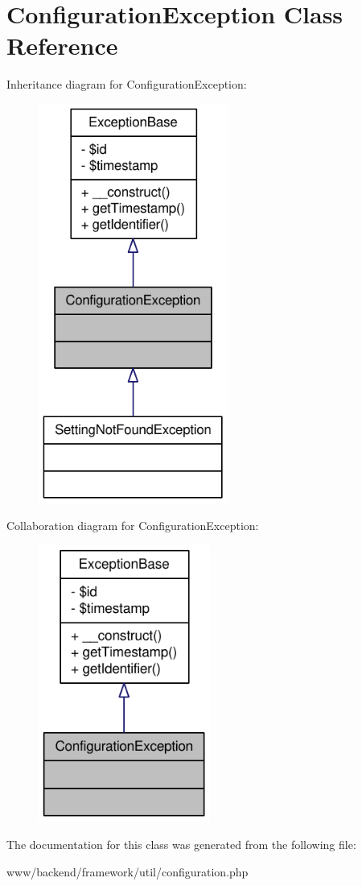 \hypertarget{classConfigurationException}{
\section{ConfigurationException Class Reference}
\label{classConfigurationException}
}


Inheritance diagram for ConfigurationException:\nopagebreak
\begin{figure}[H]
\begin{center}
\leavevmode
\includegraphics[width=176pt]{classConfigurationException__inherit__graph}
\end{center}
\end{figure}


Collaboration diagram for ConfigurationException:\nopagebreak
\begin{figure}[H]
\begin{center}
\leavevmode
\includegraphics[width=160pt]{classConfigurationException__coll__graph}
\end{center}
\end{figure}


The documentation for this class was generated from the following file:\begin{DoxyCompactItemize}
\item 
www/backend/framework/util/configuration.php\end{DoxyCompactItemize}
